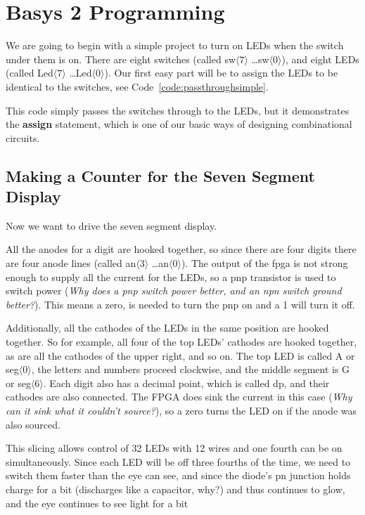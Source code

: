 \chapter{Basys 2 Programming}

We are going to begin with a simple project to turn on LEDs when the switch under them is on.  There are eight switches (called sw$\langle 7\rangle$ \ldots sw$\langle 0\rangle$), and eight LEDs  (called Led$\langle 7\rangle$ \ldots Led$\langle 0\rangle$).  Our first easy part will be to assign the LEDs to be identical to the switches, see Code~\ref{code:passthroughsimple}.


This code simply passes the switches through to the LEDs, but it demonstrates the \textbf{assign} statement, which is one of our basic ways of designing combinational circuits.

\section{Making a Counter for the Seven Segment Display}

Now we want to drive the seven segment display.

All the anodes for a digit are hooked together, so since there are four digits there are four anode lines (called an$\langle 3\rangle$ \ldots an$\langle 0\rangle$).  The output of the fpga is not strong enough to supply all the current for the LEDs, so a pnp transistor is used to switch power (\emph{Why does a pnp switch power better, and an npn switch ground better?}).  This means a zero, is needed to turn the pnp on and a 1 will turn it off.

Additionally, all the cathodes of the LEDs in the same position are hooked together.  So for example, all four of the top LEDs' cathodes are hooked together, as are all the cathodes of the upper right, and so on.  The top LED is called A or seg$\langle 0\rangle$, the letters and numbers proceed clockwise, and the middle segment is G or seg$\langle 6\rangle$.  Each digit also has a decimal point, which is called dp, and their cathodes are also connected.   The FPGA does sink the current in this case (\emph{Why can it sink what it couldn't source?}), so a zero turns the LED on if the anode was also sourced.

This slicing allows control of 32 LEDs with 12 wires and one fourth can be on simultaneously.  Since each LED will be off three fourths of the time, we need to switch them faster than the eye can see, and since the diode's pn junction holds charge for a bit (discharges like a capacitor, why?) and thus continues to glow, and the eye continues to see light for a bit 